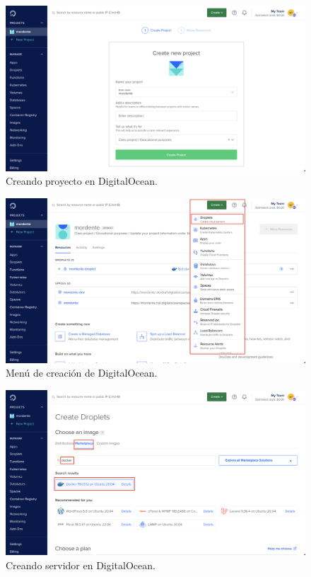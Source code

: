 \begin{figure}[h]
\centering
\includegraphics[width=\textwidth]{imagenes/implementacion/digitalocean_crear_proyecto.png}
\caption{Creando proyecto en DigitalOcean.}
\label{fig:digitalOceanCrearProyecto}
\end{figure}

\begin{figure}[h]
\centering
\includegraphics[width=\textwidth]{imagenes/implementacion/digitalocean_panel_crear.png}
\caption{Menú de creación de DigitalOcean.}
\label{fig:digitalOceanMenuCreacion}
\end{figure}

\begin{figure}[h]
\centering
\includegraphics[width=\textwidth]{imagenes/implementacion/digitalocean_creando_server.png}
\caption{Creando servidor en DigitalOcean.}
\label{fig:digitalOceanCrearServidor}
\end{figure}

